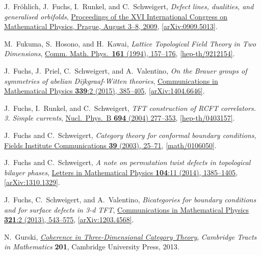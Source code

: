 \documentclass[12pt]{scrartcl}
\newcommand\doi[2]        {\href{http://dx.doi.org/#1}{#2}}
\theoremstyle{definition}
\numberwithin{equation}{section}
\numberwithin{definition}{section}
\numberwithin{figure}{section}
\begin{document}
\begin{thebibliography}{BDSPV}
J.~Fr\"ohlich, J.~Fuchs, I.~Runkel, and C.~Schweigert,
\textsl{Defect lines, dualities, and generalised orbifolds}, 
\doi{10.1142/9789814304634_0056}{Proceedings of the XVI International Congress on Mathematical Physics, Prague, August 3--8, 2009}, \href{http://arxiv.org/abs/0909.5013}{[arXiv:0909.5013]}.

M.~Fukuma, S.~Hosono, and H.~Kawai, 
\textsl{Lattice Topological Field Theory in Two Dimensions}, 
\doi{10.1007/BF02099416}{Comm. Math. Phys.~\textbf{161} (1994), 157--176},
\href{http://www.arxiv.org/abs/hep-th/9212154}{[hep-th/9212154]}.

J.~Fuchs, J.~Priel, C.~Schweigert, and A.~Valentino,
\textsl{On the Brauer groups of symmetries of abelian Dijkgraaf-Witten theories}, 
\doi{10.1007/s00220-015-2420-y}{Communications in Mathematical Physics \textbf{339}:2 (2015), 385--405}, 
\href{http://arxiv.org/abs/1404.6646}{[arXiv:1404.6646]}.

J.~Fuchs, I.~Runkel, and C.~Schweigert,
\textsl{TFT construction of RCFT correlators. 3. Simple currents}, 
\doi{10.1016/j.nuclphysb.2004.05.014}{Nucl.\ Phys.\ B \textbf{694} (2004) 277--353}, 
\href{http://arxiv.org/abs/hep-th/0403157}{[hep-th/0403157]}.

J.~Fuchs and C.~Schweigert,
\textsl{Category theory for conformal boundary conditions}, 
\doi{10.1090/fic/039/03}{Fields Institute Communications \textbf{39} (2003), 25--71}, 
\href{http://www.arxiv.org/abs/math/0106050}{[math/0106050]}.

J.~Fuchs and C.~Schweigert,
\textsl{A note on permutation twist defects in topological bilayer phases}, 
\doi{10.1007/s11005-014-0719-9}{Letters in Mathematical Physics \textbf{104}:11 (2014), 1385--1405}, 
\href{http://arxiv.org/abs/1310.1329}{[arXiv:1310.1329]}.

J.~Fuchs, C.~Schweigert, and A.~Valentino,
\textsl{Bicategories for boundary conditions and for surface defects in 3-d TFT}, 
\doi{10.1007/s00220-013-1723-0}{Communications in Mathematical Physics \textbf{321}:2 (2013), 543--575}, 
\href{http://arxiv.org/abs/1203.4568}{[arXiv:1203.4568]}.

N.~Gurski, 
\textsl{\doi{10.1017/CBO9781139542333}{Coherence in Three-Dimensional Category Theory}}, 
\textsl{Cambridge Tracts in Mathematics} \textbf{201}, Cambridge University Press, 2013.


\end{thebibliography}
\end{document}
